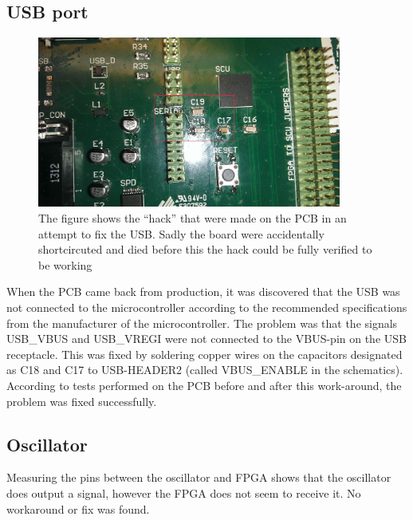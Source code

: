 \subsection{ USB port }

\label{subsec:pcb:problem:usb}
\begin{figure}[H]
\centering
\includegraphics[width=10cm,keepaspectratio]{pcb/vreghack.jpg}
\caption{The figure shows the ``hack'' that were made on the PCB in an attempt to fix the USB. Sadly the board were accidentally shortcircuted and died before this the hack could be fully verified to be working}
\label{figure:vreghack}
\end{figure}

When the PCB came back from production, it was discovered that the USB was not connected to the microcontroller
according to the recommended specifications from the manufacturer of the microcontroller. 
The problem was that the signals USB\_VBUS and USB\_VREGI were not connected to the VBUS-pin on the USB receptacle. This was fixed by soldering copper wires on the capacitors designated as C18 and C17 to USB-HEADER2 (called VBUS\_ENABLE in the schematics).
According to tests performed on the PCB before and after this work-around, the problem was fixed successfully.

\subsection{Oscillator} 
Measuring the pins between the oscillator and FPGA shows that the oscillator does output a signal, however the FPGA does not seem to receive it.
No workaround or fix was found.

